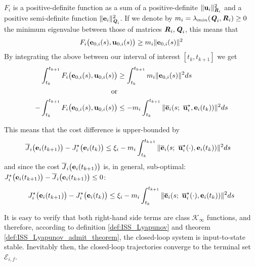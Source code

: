 \begin{gg_box}
  $F_i$ is a positive-definite function as a sum of a positive-definite
  $\|\bm{\mathbf{u}}_i\|^2_{\bm{\mathit{R}}_i}$ and a positive semi-definite function
  $\|\bm{\mathbf{e}}_i\|^2_{\bm{\mathit{Q}}_i}$. If we denote by
  $m_i = \lambda_{min}(\bm{\mathit{Q}}_i, \bm{\mathit{R}}_i) \geq 0$ the minimum eigenvalue
  between those of matrices $\bm{\mathit{R}}_i, \bm{\mathit{Q}}_i$, this means that
  \begin{align}
    F_i \big(\bm{\mathbf{e}}_{0,i}(s), \bm{\mathbf{u}}_{0,i} (s)\big) \geq m_i \|\bm{\mathbf{e}}_{0,i}(s)\|^2
  \end{align}
  By integrating the above between our interval of interest $[t_k, t_{k+1}]$ we get
  \begin{align}
    \int_{t_k}^{t_{k+1}} F_i \big(\vect{e}_{0,i}(s), \vect{u}_{0,i} (s)\big) &\geq \int_{t_k}^{t_{k+1}} m_i \|\vect{e}_{0,i}(s)\|^2 ds \\
    \text{or}\\
    -\int_{t_k}^{t_{k+1}} F_i \big(\vect{e}_{0,i}(s), \vect{u}_{0,i} (s)\big)
    &\leq -m_i \int_{t_k}^{t_{k+1}} \| \overline{\vect{e}}_i(s;\ \overline{\vect{u}}_i^{\star}, \vect{e}_i(t_k)) \|^2 ds
  \end{align}
\end{gg_box}
This means that the cost difference is upper-bounded by
\begin{align}
  \overline{J}_i\big(\bm{\mathbf{e}}_i(t_{k+1})\big) - J_i^{\star}\big(\bm{\mathbf{e}}_i(t_k)\big)
    &\leq \xi_i-m_i \int_{t_k}^{t_{k+1}} \| \overline{\bm{\mathbf{e}}}_i(s;\ \overline{\bm{\mathbf{u}}}_i^{\star}(\cdot), \bm{\mathbf{e}}_i(t_k)) \|^2 ds
\end{align}
and since the cost $\overline{J}_i\big(\bm{\mathbf{e}}_i(t_{k+1})\big)$ is, in general,
sub-optimal: $J_i^{\star}\big(\bm{\mathbf{e}}_i(t_{k+1})\big) - \overline{J}_i\big(\bm{\mathbf{e}}_i(t_{k+1})\big) \leq 0$:
\begin{align}
 J_i^{\star}\big(\vect{e}_i(t_{k+1})\big) - J_i^{\star}\big(\vect{e}_i(t_k)\big)
   \leq \xi_i-m_i \int_{t_k}^{t_{k+1}} \| \overline{\vect{e}}_i(s;\ \overline{\vect{u}}_i^{\star}(\cdot), \vect{e}_i(t_k)) \|^2 ds
 \label{eq:J_opt_between_consecutive_k_2}
\end{align}

It is easy to verify that both right-hand side terms are class
$\mathcal{K}_{\infty}$ functions, and therefore, according to definition
\eqref{def:ISS_Lyapunov} and theorem \eqref{def:ISS_Lyapunov_admit_theorem},
the closed-loop system is input-to-state stable. Inevitably then, the
closed-loop trajectories converge to the terminal set $\mathcal{E}_{i,f}$.





